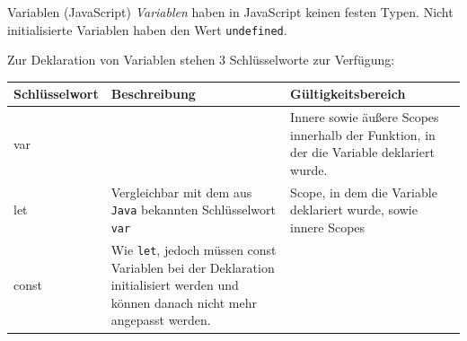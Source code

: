 \begin{defi}{Variablen (JavaScript)}
    \emph{Variablen} haben in JavaScript keinen festen Typen.
    Nicht initialisierte Variablen haben den Wert \texttt{undefined}.

    Zur Deklaration von Variablen stehen 3 Schlüsselworte zur Verfügung:

    \begin{tabularx}{\textwidth}{|l|X|X|}
        \hline
        Schlüsselwort & Beschreibung                                                                                                                            & Gültigkeitsbereich                                                                       \\\hline\hline
        var           &                                                                                                                                         & Innere sowie äußere Scopes innerhalb der Funktion, in der die Variable deklariert wurde. \\\hline
        let           & Vergleichbar mit dem aus \texttt{Java} bekannten Schlüsselwort \texttt{var}                                                             & Scope, in dem die Variable deklariert wurde, sowie innere Scopes                         \\\hline
        const         & Wie \texttt{let}, jedoch müssen const Variablen bei der Deklaration initialisiert werden und können danach nicht mehr angepasst werden. &                                                                                          \\\hline
    \end{tabularx}
\end{defi}

